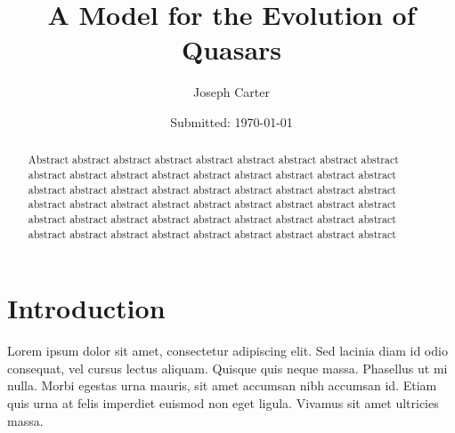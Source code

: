 \documentclass[12pt, twocolumn]{revtex4}    %
\begin{document}
                     


\title{A Model for the Evolution of Quasars} 
\date{Submitted: \today{}}
\author{Joseph Carter}

\begin{abstract}              
 
Abstract abstract abstract abstract abstract abstract abstract abstract abstract abstract abstract abstract abstract abstract abstract abstract abstract abstract abstract abstract abstract abstract abstract abstract abstract abstract abstract abstract abstract abstract abstract abstract abstract abstract abstract abstract abstract abstract abstract abstract abstract abstract abstract abstract abstract abstract abstract abstract abstract abstract abstract abstract abstract abstract 

\end{abstract}


\maketitle
\onecolumngrid


\tableofcontents
\newpage
\twocolumngrid


\section{Introduction}

Lorem ipsum dolor sit amet, consectetur adipiscing elit. Sed lacinia diam id odio consequat, vel cursus lectus aliquam. Quisque quis neque massa. Phasellus ut mi nulla. Morbi egestas urna mauris, sit amet accumsan nibh accumsan id. Etiam quis urna at felis imperdiet euismod non eget ligula. Vivamus sit amet ultricies massa.

\onecolumngrid
\end{document}
